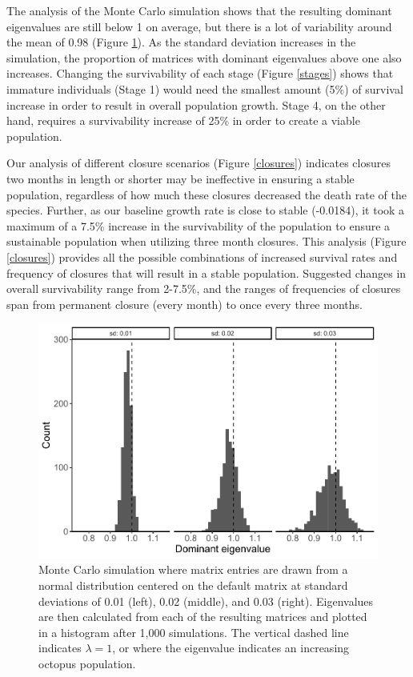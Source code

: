 \documentclass[
]{article}
\begin{document}
The analysis of the Monte Carlo simulation shows that the resulting dominant eigenvalues are still below 1 on average, but there is a lot of variability around the mean of 0.98 (Figure \ref{MonteUncertainty}). As the standard deviation increases in the simulation, the proportion of matrices with dominant eigenvalues above one also increases. Changing the survivability of each stage (Figure \ref{stages}) shows that immature individuals (Stage 1) would need the smallest amount (5\%) of survival increase in order to result in overall population growth. Stage 4, on the other hand, requires a survivability increase of 25\% in order to create a viable population.

Our analysis of different closure scenarios (Figure \ref{closures}) indicates closures two months in length or shorter may be ineffective in ensuring a stable population, regardless of how much these closures decreased the death rate of the species. Further, as our baseline growth rate is close to stable (-0.0184), it took a maximum of a 7.5\% increase in the survivability of the population to ensure a sustainable population when utilizing three month closures. This analysis (Figure \ref{closures}) provides all the possible combinations of increased survival rates and frequency of closures that will result in a stable population. Suggested changes in overall survivability range from 2-7.5\%, and the ranges of frequencies of closures span from permanent closure (every month) to once every three months.





\begin{figure}
\centering
\includegraphics{Wulfing_OCyaneaSubmission_files/figure-latex/MonteUncertainty-1.pdf}
\caption{\label{fig:MonteUncertainty}Monte Carlo simulation where matrix entries are drawn from a normal distribution centered on the default matrix at standard deviations of 0.01 (left), 0.02 (middle), and 0.03 (right). Eigenvalues are then calculated from each of the resulting matrices and plotted in a histogram after 1,000 simulations. The vertical dashed line indicates \(\lambda = 1\), or where the eigenvalue indicates an increasing octopus population. \label{MonteUncertainty}}
\end{figure}
\end{document}
